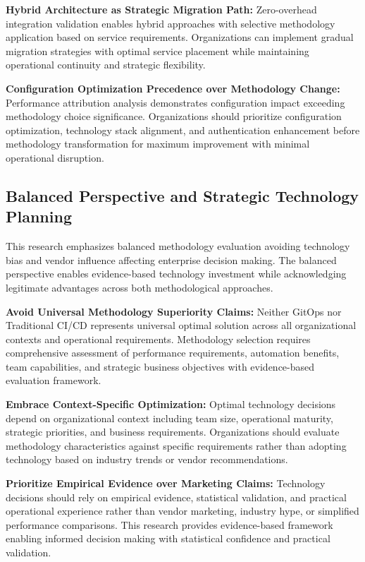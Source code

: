 \textbf{Hybrid Architecture as Strategic Migration Path:}
Zero-overhead integration validation enables hybrid approaches with selective methodology application based on service requirements. Organizations can implement gradual migration strategies with optimal service placement while maintaining operational continuity and strategic flexibility.

\textbf{Configuration Optimization Precedence over Methodology Change:}
Performance attribution analysis demonstrates configuration impact exceeding methodology choice significance. Organizations should prioritize configuration optimization, technology stack alignment, and authentication enhancement before methodology transformation for maximum improvement with minimal operational disruption.

\subsection{Balanced Perspective and Strategic Technology Planning}
\label{subsec:balanced_perspective}

This research emphasizes balanced methodology evaluation avoiding technology bias and vendor influence affecting enterprise decision making. The balanced perspective enables evidence-based technology investment while acknowledging legitimate advantages across both methodological approaches.

\textbf{Avoid Universal Methodology Superiority Claims:}
Neither GitOps nor Traditional CI/CD represents universal optimal solution across all organizational contexts and operational requirements. Methodology selection requires comprehensive assessment of performance requirements, automation benefits, team capabilities, and strategic business objectives with evidence-based evaluation framework.

\textbf{Embrace Context-Specific Optimization:}
Optimal technology decisions depend on organizational context including team size, operational maturity, strategic priorities, and business requirements. Organizations should evaluate methodology characteristics against specific requirements rather than adopting technology based on industry trends or vendor recommendations.

\textbf{Prioritize Empirical Evidence over Marketing Claims:}
Technology decisions should rely on empirical evidence, statistical validation, and practical operational experience rather than vendor marketing, industry hype, or simplified performance comparisons. This research provides evidence-based framework enabling informed decision making with statistical confidence and practical validation.

